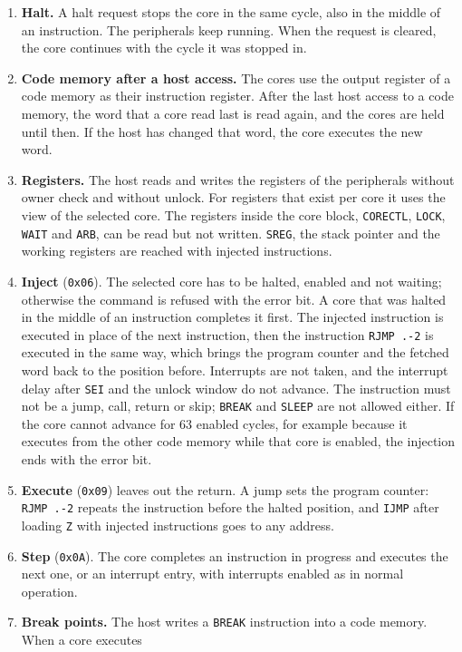 \documentclass[10pt,a4paper]{article}
\newcommand{\reg}[1]{\texttt{#1}}
\begin{document}
\begin{enumerate}[label=\textbf{L\arabic*},leftmargin=2.6em,start=5]
\item \textbf{Halt.} A halt request stops the core in the same cycle, also in the middle of an instruction. The
peripherals keep running. When the request is cleared, the core continues with the cycle it was stopped in.
\item \textbf{Code memory after a host access.} The cores use the output register of a code memory as their
instruction register. After the last host access to a code memory, the word that a core read last is read
again, and the cores are held until then. If the host has changed that word, the core executes the new word.
\item \textbf{Registers.} The host reads and writes the registers of the peripherals without owner check and without
unlock. For registers that exist per core it uses the view of the selected core. The registers inside the
core block, \reg{CORECTL}, \reg{LOCK}, \reg{WAIT} and \reg{ARB}, can be read but not written. \reg{SREG},
the stack pointer and the working registers are reached with injected instructions.
\item \textbf{Inject} (\texttt{0x06}). The selected core has to be halted, enabled and not waiting; otherwise the
command is refused with the error bit. A core that was halted in the middle of an instruction completes it
first. The injected instruction is executed in place of the next instruction, then the instruction
\texttt{RJMP .-2} is executed in the same way, which brings the program counter and the fetched word back to
the position before. Interrupts are not taken, and the interrupt delay after \texttt{SEI} and the unlock
window do not advance. The instruction must not be a jump, call, return or skip; \texttt{BREAK} and
\texttt{SLEEP} are not allowed either. If the core cannot advance for 63 enabled cycles, for example because it
executes from the other code memory while that core is enabled, the injection ends with the error bit.
\item \textbf{Execute} (\texttt{0x09}) leaves out the return. A jump sets the program counter:
\texttt{RJMP .-2} repeats the instruction before the halted position, and \texttt{IJMP} after loading
\reg{Z} with injected instructions goes to any address.
\item \textbf{Step} (\texttt{0x0A}). The core completes an instruction in progress and executes the next one, or
an interrupt entry, with interrupts enabled as in normal operation.
\item \textbf{Break points.} The host writes a \texttt{BREAK} instruction into a code memory. When a core executes

\end{enumerate}
\end{document}
